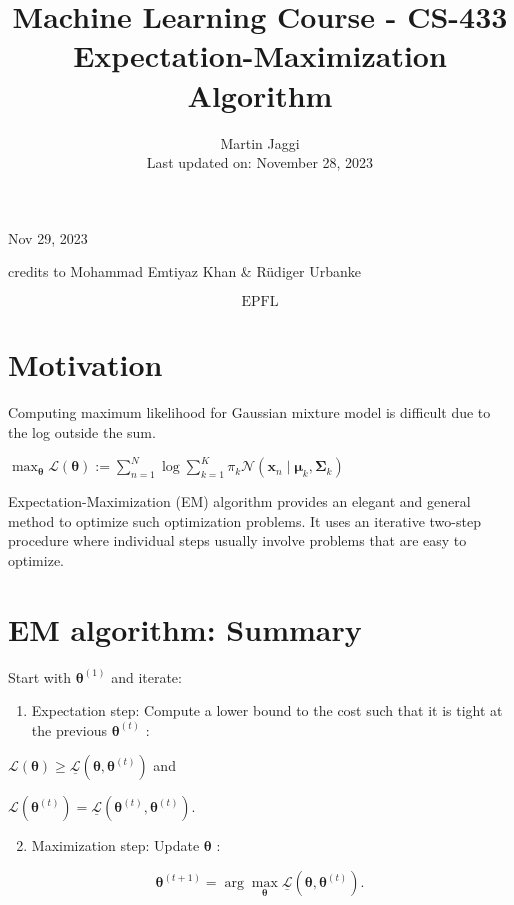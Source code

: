 \documentclass[10pt]{article}
\title{Machine Learning Course - CS-433 
 Expectation-Maximization Algorithm }
\author{Martin Jaggi\\
Last updated on: November 28, 2023}
\date{}
\begin{document}
\maketitle
Nov 29, 2023

credits to Mohammad Emtiyaz Khan \& Rüdiger Urbanke

$$
\text { EPFL }
$$

\section*{Motivation}
Computing maximum likelihood for Gaussian mixture model is difficult due to the log outside the sum.

$\max _{\boldsymbol{\theta}} \mathcal{L}(\boldsymbol{\theta}):=\sum_{n=1}^{N} \log \sum_{k=1}^{K} \pi_{k} \mathcal{N}\left(\mathbf{x}_{n} \mid \boldsymbol{\mu}_{k}, \boldsymbol{\Sigma}_{k}\right)$

Expectation-Maximization (EM) algorithm provides an elegant and general method to optimize such optimization problems. It uses an iterative two-step procedure where individual steps usually involve problems that are easy to optimize.

\section*{EM algorithm: Summary}
Start with $\boldsymbol{\theta}^{(1)}$ and iterate:

\begin{enumerate}
  \item Expectation step: Compute a lower bound to the cost such that it is tight at the previous $\boldsymbol{\theta}^{(t)}$ :
\end{enumerate}

$\mathcal{L}(\boldsymbol{\theta}) \geq \underline{\mathcal{L}}\left(\boldsymbol{\theta}, \boldsymbol{\theta}^{(t)}\right)$ and

$\mathcal{L}\left(\boldsymbol{\theta}^{(t)}\right)=\underline{\mathcal{L}}\left(\boldsymbol{\theta}^{(t)}, \boldsymbol{\theta}^{(t)}\right)$.

\begin{enumerate}
  \setcounter{enumi}{1}
  \item Maximization step: Update $\boldsymbol{\theta}$ :
\end{enumerate}

$$
\boldsymbol{\theta}^{(t+1)}=\arg \max _{\boldsymbol{\theta}} \underline{\mathcal{L}}\left(\boldsymbol{\theta}, \boldsymbol{\theta}^{(t)}\right) .
$$
\end{document}
